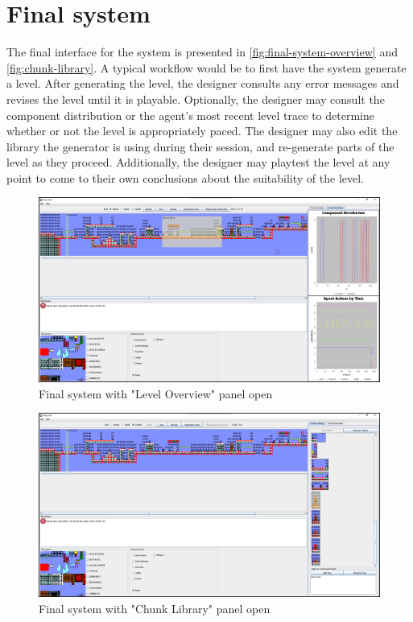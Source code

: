 \section{Final system}

The final interface for the system is presented in \autoref{fig:final-system-overview} and
\autoref{fig:chunk-library}. A typical workflow would be to first have the system generate
a level. After generating the level, the designer consults any error messages and revises
the level until it is playable. Optionally, the designer may consult the component distribution
or the agent's most recent level trace to determine whether or not the level is appropriately
paced. The designer may also edit the library the generator is using during their session,
and re-generate parts of the level as they proceed. Additionally, the designer may playtest
the level at any point to come to their own conclusions about the suitability of the level.

\begin{figure}[h]
    \includegraphics[width=\linewidth]{img/fig14-final-system-overview.png}
    \caption{Final system with "Level Overview" panel open}
    \label{fig:final-system-overview}
\end{figure}

\begin{figure}[h]
    \includegraphics[width=\linewidth]{img/fig15-chunk-library.png}
    \caption{Final system with "Chunk Library" panel open}
    \label{fig:chunk-library}
\end{figure}